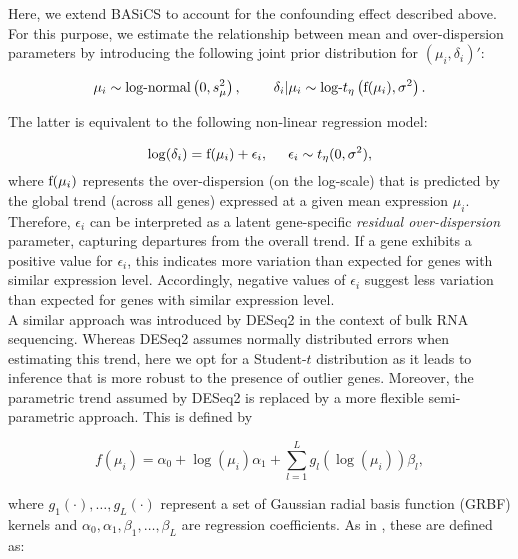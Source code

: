 Here, we extend BASiCS to account for the confounding effect described above. For this purpose, we estimate the relationship between mean and over-dispersion parameters by introducing the following joint prior distribution for $(\mu_i, \delta_i)'$: 

\begin{equation} \label{eq::jointprior} \mu_i \sim \mbox{log-normal}\left(0, s^2_{\mu}\right), \hspace{0.8cm}
\delta_i | \mu_i \sim \mbox{log-}t_{\eta}\left( \textnormal{f}(\mu_i), \sigma^2 \right).
\end{equation} 

The latter is equivalent to the following non-linear regression model:

\begin{equation} \label{eq::regression}
\log(\delta_i) =\textnormal{f}(\mu_i)+\epsilon_i, \hspace{0.5cm} \epsilon_i \sim{}t_{\eta}(0,\sigma^2), 
\end{equation} where $\textnormal{f}(\mu_i)$ represents the over-dispersion (on the log-scale) that is predicted by the global trend (across all genes) expressed at a given mean expression $\mu_i$. Therefore, $\epsilon_i$ can be interpreted as a latent gene-specific {\it residual over-dispersion} parameter, capturing departures from the overall trend. If a gene exhibits a positive value for $\epsilon_i$, this indicates more variation than expected for genes with similar expression level. Accordingly, negative values of $\epsilon_i$ suggest less variation than expected for genes with similar expression level. \\ 

A similar approach was introduced by DESeq2 \citep{Love2014} in the context of bulk RNA sequencing. Whereas DESeq2 assumes normally distributed errors when estimating this trend, here we opt for a Student-$t$ distribution as it leads to inference that is more robust to the presence of outlier genes. Moreover, the parametric trend assumed by DESeq2 is replaced by a more flexible semi-parametric approach. This is defined by

\begin{equation} \label{eq::trend}
f(\mu_i) = \alpha_0 + \log(\mu_i)\alpha_1 + \sum_{l=1}^L g_l(\log(\mu_i))\beta_l,
\end{equation} 

where $g_1(\cdot), \ldots, g_L(\cdot)$ represent a set of Gaussian radial basis function (GRBF) kernels and $\alpha_0, \alpha_1, \beta_1, \ldots, \beta_L$ are regression coefficients. As in \cite{Kapourani2016}, these are defined as: 


